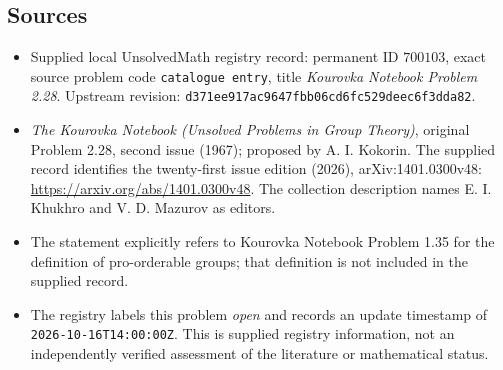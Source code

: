 \documentclass[11pt]{article}
\begin{document}
\subsection{Sources}
\begin{itemize}
\item Supplied local UnsolvedMath registry record: permanent ID \(700103\), exact source problem code \texttt{catalogue entry}, title \emph{Kourovka Notebook Problem 2.28}. Upstream revision: \texttt{d371ee917ac9647fbb06cd6fc529deec6f3dda82}.
\item \emph{The Kourovka Notebook (Unsolved Problems in Group Theory)}, original Problem 2.28, second issue (1967); proposed by A. I. Kokorin. The supplied record identifies the twenty-first issue edition (2026), arXiv:1401.0300v48: \url{https://arxiv.org/abs/1401.0300v48}. The collection description names E. I. Khukhro and V. D. Mazurov as editors.
\item The statement explicitly refers to Kourovka Notebook Problem 1.35 for the definition of pro-orderable groups; that definition is not included in the supplied record.
\item The registry labels this problem \emph{open} and records an update timestamp of \texttt{2026-10-16T14:00:00Z}. This is supplied registry information, not an independently verified assessment of the literature or mathematical status.
\end{itemize}
\end{document}
